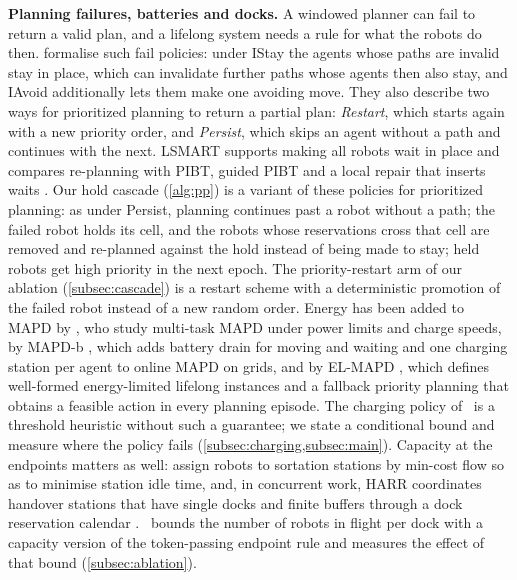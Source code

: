 \noindent\textbf{Planning failures, batteries and docks.}
A windowed planner can fail to return a valid plan, and a lifelong system
needs a rule for what the robots do then. \citet{morag2023adapting}
formalise such fail policies: under IStay the agents whose paths are invalid
stay in place, which can invalidate further paths whose agents then also
stay, and IAvoid additionally lets them make one avoiding move. They also
describe two ways for prioritized planning to return a partial plan:
\emph{Restart}, which starts again with a new priority order, and
\emph{Persist}, which skips an agent without a path and continues with the
next. LSMART
supports making all robots wait in place and compares re-planning with PIBT,
guided PIBT and a local repair that inserts waits \citep{yan2026lsmart}. Our
hold cascade
(\cref{alg:pp}) is a variant of these policies for prioritized planning: as
under Persist, planning continues past a robot without a path; the
failed robot holds its cell, and the robots whose reservations cross that
cell are removed and re-planned against the hold instead of being made to
stay; held robots get high priority in the next epoch. The priority-restart
arm of our ablation (\cref{subsec:cascade}) is a restart scheme with a
deterministic promotion of the failed robot instead of a new random order. Energy has been added
to MAPD by \citet{kudo2024anytime}, who study multi-task MAPD under power
limits and charge speeds, by MAPD-b \citep{bavaro2025mapdb}, which adds
battery drain for moving and waiting and one charging station per agent to
online MAPD on grids, and by EL-MAPD \citep{tang2026energy}, which defines
well-formed energy-limited lifelong instances and a fallback priority
planning that obtains a feasible action in every planning episode. The
charging policy of \sname\ is a threshold heuristic without such a
guarantee; we state a conditional bound and measure where the policy fails
(\cref{subsec:charging,subsec:main}). Capacity at the endpoints matters as
well: \citet{kou2020idle} assign robots to sortation stations by min-cost
flow so as to minimise station idle time, and, in concurrent work, HARR
coordinates handover stations that have single docks and finite buffers
through a dock reservation calendar \citep{zang2026handover}. \sname\ bounds
the number of robots in flight per dock with a capacity version of the
token-passing endpoint rule and
measures the effect of that bound (\cref{subsec:ablation}).

